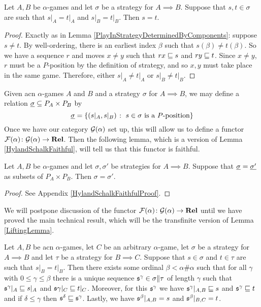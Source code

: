 \documentclass[11pt]{article} %
\begin{document}
\begin{lemma}
  \label{TransPlayInStrategyDeterminedByComponents}
  Let $A,B$ be $\alpha$-games and let $\sigma$ be a strategy for $A\implies B$.  Suppose that $s,t\in\sigma$ are such that $s\vert_A=t\vert_A$ and $s\vert_B=t\vert_B$.  Then $s=t$.
  \begin{proof}
    Exactly as in Lemma \ref{PlayInStrategyDeterminedByComponents}: suppose $s\ne t$.  By well-ordering, there is an earliest index $\beta$ such that $s(\beta)\ne t(\beta)$.  So we have a sequence $r$ and moves $x\ne y$ such that $rx\sqsubseteq s$ and $ry\sqsubseteq t$.  Since $x\ne y$, $r$ must be a $P$-position by the definition of strategy, and so $x,y$ must take place in the same game.  Therefore, either $s\vert_A\ne t\vert_A$ or $s\vert_B\ne t\vert_B$.
  \end{proof}
\end{lemma}

Given acn $\alpha$-games $A$ and $B$ and a strategy $\sigma$ for $A\implies B$, we may define a relation $\underline{\sigma}\subseteq P_A\times P_B$ by
\[
  \underline{\sigma} = \{(s\vert_A,s\vert_B)\;\colon\;\textrm{$s\in\sigma$ is a $P$-position}\}
  \]
Once we have our category $\mathcal G(\alpha)$ set up, this will allow us to define a functor $\mathcal F(\alpha)\colon{}\mathcal G(\alpha)\to{}{\normalfont\textbf{Rel}}$.  Then the following lemma, which is a version of Lemma \ref{HylandSchalkFaithful}, will tell us that this functor is faithful.

\begin{lemma}
  \label{TransHylandSchalkFaithful}
  Let $A,B$ be $\alpha$-games and let $\sigma,\sigma'$ be strategies for $A\implies B$.  Suppose that $\underline{\sigma}=\underline{\sigma'}$ as subsets of $P_A\times P_B$.  Then $\sigma=\sigma'$.
  \begin{proof}
    See Appendix \ref{HylandSchalkFaithfulProof}.
  \end{proof}
\end{lemma}

We will postpone discussion of the functor $\mathcal F(\alpha)\colon{}\mathcal G(\alpha)\to{}{\normalfont\textbf{Rel}}$ until we have proved the main technical result, which will be the transfinite version of Lemma \ref{LiftingLemma}.  

\begin{lemma}
  \label{TransLiftingLemma}
  Let $A,B$ be acn $\alpha$-games, let $C$ be an arbitrary $\alpha$-game, let $\sigma$ be a strategy for $A\implies B$ and let $\tau$ be a strategy for $B\implies C$.  Suppose that $s\in\sigma$ and $t\in\tau$ are such that $s\vert_B=t\vert_B$.  Then there exists some ordinal $\beta<\alpha\#\alpha$ such that for all $\gamma$ with $0\le\gamma\le\beta$ there is a unique sequence $\mathfrak s^\gamma\in\sigma\|\tau$ of length $\gamma$ such that $\mathfrak s^\gamma\vert_A\sqsubseteq s\vert_A$ and $\mathfrak s\gamma\vert_C\sqsubseteq t\vert_C$.  Moreover, for this $\mathfrak s^\gamma$ we have $\mathfrak s^\gamma\vert_{A,B}\sqsubseteq s$ and $\mathfrak s^\gamma\sqsubseteq t$ and if $\delta\le\gamma$ then $\mathfrak s^\delta\sqsubseteq\mathfrak s^\gamma$.  Lastly, we have $\mathfrak s^\beta\vert_{A,B}=s$ and $\mathfrak s^\beta\vert_{B,C}=t$.
\end{lemma}
\end{document}
